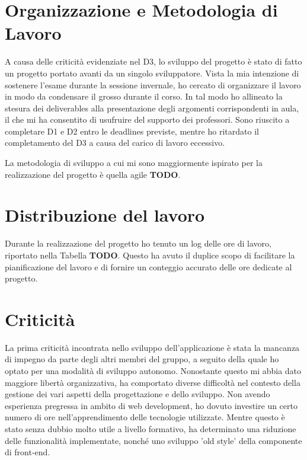 \documentclass[9pt]{extarticle}
\begin{document}
\customtitle

\tableofcontents
\newpage

\section{Organizzazione e Metodologia di Lavoro}

A causa delle criticità evidenziate nel D3, lo sviluppo del progetto è stato
di fatto un progetto portato avanti da un singolo sviluppatore. Vista la mia
intenzione di sostenere l'esame durante la sessione invernale, ho cercato di
organizzare il lavoro in modo da condensare il grosso durante il corso. In tal
modo ho allineato la stesura dei deliverables alla presentazione degli
argomenti corrispondenti in aula, il che mi ha consentito di usufruire del
supporto dei professori. Sono riuscito a completare D1 e D2 entro le deadlines
previste, mentre ho ritardato il completamento del D3 a causa del carico di
lavoro eccessivo.\newline

La metodologia di sviluppo a cui mi sono maggiormente ispirato per la
realizzazione del progetto è quella agile \textbf{TODO}.

\section{Distribuzione del lavoro}

Durante la realizzazione del progetto ho tenuto un log delle ore di lavoro,
riportato nella Tabella \textbf{TODO}. Questo ha avuto il duplice scopo di
facilitare la pianificazione del lavoro e di fornire un conteggio accurato
delle ore dedicate al progetto.

\section{Criticità}

La prima criticità incontrata nello sviluppo dell'applicazione è stata
la mancanza di impegno da parte degli altri membri del gruppo, a
seguito della quale ho optato per una modalità di sviluppo autonomo.
Nonostante questo mi abbia dato maggiore libertà organizzativa, ha comportato
diverse difficoltà nel contesto della gestione dei vari aspetti della
progettazione e dello sviluppo. Non avendo esperienza pregressa in ambito di
web development, ho dovuto investire un certo numero di ore nell'apprendimento
delle tecnologie utilizzate. Mentre questo è stato senza dubbio molto utile
a livello formativo, ha determinato una riduzione delle funzionalità
implementate, nonché uno sviluppo 'old style' della componente di front-end.
\end{document}
